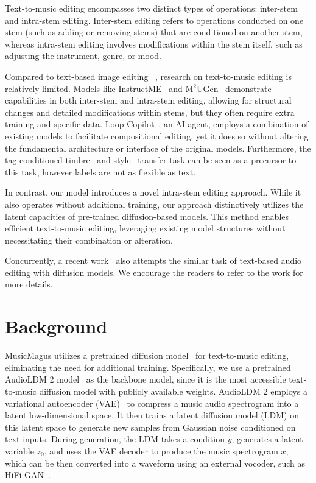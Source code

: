 Text-to-music editing encompasses two distinct types of operations: inter-stem and intra-stem editing. Inter-stem editing refers to operations conducted on one stem (such as adding or removing stems) that are conditioned on another stem, whereas intra-stem editing involves modifications within the stem itself, such as adjusting the instrument, genre, or mood.

Compared to text-based image editing ~\cite{prompt2prompt,pix2pix,instructimagen}, research on text-to-music editing is relatively limited.  Models like InstructME~\cite{instructme} and M$^2$UGen~\cite{m2ugen} demonstrate capabilities in both inter-stem and intra-stem editing, allowing for structural changes and detailed modifications within stems, but they often require extra training and specific data. Loop Copilot~\cite{loopcopilot}, an AI agent, employs a combination of existing models to facilitate compositional editing, yet it does so without altering the fundamental architecture or interface of the original models. Furthermore, the tag-conditioned timbre~\cite{transplayer} and style~\cite{position} transfer task can be seen as a precursor to this task, however labels are not as flexible as text.

In contrast, our model introduces a novel intra-stem editing approach. While it also operates without additional training, our approach distinctively utilizes the latent capacities of pre-trained diffusion-based models. This method enables efficient text-to-music editing, leveraging existing model structures without necessitating their combination or alteration.

Concurrently, a recent work~\cite{ddpm-edit} also attempts the similar task of text-based audio editing with diffusion models. We encourage the readers to refer to the work for more details.

\section{Background}

MusicMagus utilizes a pretrained diffusion model~\cite{ddpm} for text-to-music editing, eliminating the need for additional training. Specifically, we use a pretrained AudioLDM 2 model~\cite{audioldm2} as the backbone model, since it is the most accessible text-to-music diffusion model with publicly available weights. AudioLDM 2 employs a variational autoencoder (VAE)~\cite{vae} to compress a music audio spectrogram into a latent low-dimensional space. It then trains a latent diffusion model (LDM) on this latent space to generate new samples from Gaussian noise conditioned on text inputs. During generation, the LDM takes a condition \( y \), generates a latent variable \( z_0 \), and uses the VAE decoder to produce the music spectrogram \( x \), which can be then converted into a waveform using an external vocoder, such as HiFi-GAN~\cite{hifigan}.

